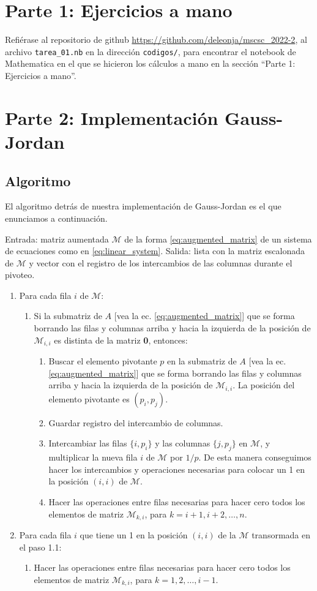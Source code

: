 \documentclass[11pt,letterpaper]{article}
\newcommand{\mcM}{\mathcal{M}}
\begin{document}
\section{Parte 1: Ejercicios a mano}
Refiérase al repositorio de github \href{https://github.com/deleonja/mscsc\_2022-2}
{https://github.com/deleonja/mscsc\_2022-2}, al archivo \verb|tarea_01.nb|
en la dirección \verb|codigos/|, para encontrar el notebook de Mathematica
en el que se hicieron los cálculos a mano en la sección ``Parte 1: Ejercicios a mano''. 

\section{Parte 2: Implementación Gauss-Jordan}
\subsection{Algoritmo}
El algoritmo detrás de nuestra implementación de Gauss-Jordan
es el que enunciamos a continuación.

Entrada: matriz aumentada $\mcM$ de la forma \eqref{eq:augmented_matrix} 
de un sistema de ecuaciones como en \eqref{eq:linear_system}. Salida:
lista con la matriz escalonada de $\mcM$ y vector con el registro de
los intercambios de las columnas durante el pivoteo.
\begin{enumerate}
\item Para cada fila $i$ de $\mcM$:
\begin{enumerate}
\item Si la submatriz de $A$ 
[vea la ec. \eqref{eq:augmented_matrix}] que se forma borrando las filas
y columnas arriba y hacia la izquierda de la posición de $\mcM_{i,i}$ es distinta
de la matriz \textbf{0}, entonces:
\begin{enumerate}
\item Buscar el elemento pivotante $p$ en la submatriz de $A$ 
[vea la ec. \eqref{eq:augmented_matrix}] que se forma borrando las filas
y columnas arriba y hacia la izquierda de la posición de $\mcM_{i,i}$. La posición 
del elemento pivotante es $(p_i,p_j)$.
\item Guardar registro del intercambio de columnas.
\item Intercambiar las filas $\{i,p_i\}$ y las columnas $\{j,p_j\}$ en $\mcM$, y multiplicar
la nueva fila $i$ de $\mcM$ por $1/p$. De esta manera conseguimos hacer los intercambios
y operaciones necesarias para colocar un 1 en la posición $(i,i)$ de $\mcM$.
\item Hacer las operaciones entre filas necesarias para hacer cero todos 
los elementos de matriz $\mcM_{k,i}$, para $k=i+1,i+2,\ldots,n$.
\end{enumerate}
\end{enumerate}
\item Para cada fila $i$ que tiene un 1 en la posición $(i,i)$ de la $\mcM$ 
transormada en el paso 1.1:
\begin{enumerate}
\item Hacer las operaciones entre filas necesarias para hacer cero todos 
los elementos de matriz $\mcM_{k,i}$, para $k=1,2,\ldots,i-1$.
\end{enumerate}
\end{enumerate}
\end{document}

